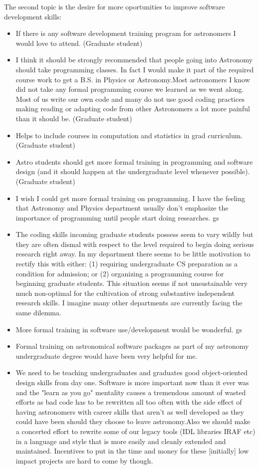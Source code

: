 The second topic is the desire for more oportunities to improve software development skills:
\begin{itemize}
\item{If there is any software development training program for astronomers I would love to attend. (Graduate student)}
\item{I think it should be strongly recommended that people going into Astronomy should take programming classes. In fact I would make it part of the required course work to get a B.S. in Physics or Astronomy.Most astronomers I know did not take any formal programming course we learned as we went along. Most of us write our own code and many do not use good coding practices making reading or adapting code from other Astronomers a lot more painful than it should be. (Graduate student)}
\item{Helps to include courses in computation and statistics in grad curriculum. (Graduate student)}
\item{Astro students should get more formal training in programming and software design (and it should happen at the undergraduate level whenever possible). (Graduate student)}
\item{I wish I could get more formal training on programming. I have the feeling that Astronomy and Physics department usually don't emphasize the importance of programming until people start doing researches. gs}
\item{The coding skills incoming graduate students possess seem to vary wildly but they are often dismal with respect to the level required to begin doing serious research right away. In my department there seems to be little motivation to rectify this with either: (1) requiring undergraduate CS preparation as a condition for admission; or (2) organizing a programming course for beginning graduate students. This situation seems if not unsustainable very much non-optimal for the cultivation of strong substantive independent research skills. I imagine many other departments are currently facing the same dilemma.}
\item{More formal training in software use/development would be wonderful. gs}
\item{Formal training on astronomical software packages as part of my astronomy undergraduate degree would have been very helpful for me.}
\item{We need to be teaching undergraduates and graduates good object-oriented design skills from day one. Software is more important now than it ever was and the "learn as you go" mentality causes a tremendous amount of wasted efforts as bad code has to be rewritten all too often with the side effect of having astronomers with career skills that aren't as well developed as they could have been should they choose to leave astronomy.Also we should make a concerted effort to rewrite some of our legacy tools (IDL libraries IRAF etc) in a language and style that is more easily and cleanly extended and maintained. Incentives to put in the time and money for these [initially] low impact projects are hard to come by though.}

\end{itemize}

